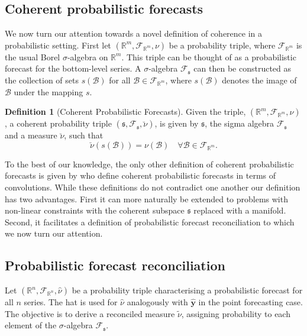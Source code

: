 \documentclass[12pt]{article}
\theoremstyle{definition}
\newtheorem{definition}{Definition}[section]
\begin{document}
\subsection{Coherent probabilistic forecasts}

We now turn our attention towards a novel definition of coherence in a probabilistic setting.  First let $(\mathbb{R}^m, \mathscr{F}_{\mathbb{R}^m}, \nu)$ be a probability triple, where $\mathscr{F}_{\mathbb{R}^m}$ is the usual Borel $\sigma$-algebra on $\mathbb{R}^m$. This triple can be thought of as a probabilistic forecast for the bottom-level series.  A $\sigma$-algebra $\mathscr{F}_{\mathfrak{s}}$ can then be constructed as the collection of sets $s(\mathcal{B})$ for all $\mathcal{B}\in \mathscr{F}_{\mathbb{R}^m}$, where $s(\mathcal{B})$ denotes the image of $\mathcal{B}$ under the mapping $s$.

\begin{definition}[Coherent Probabilistic Forecasts]\label{def:cohprob}
	Given the triple, $(\mathbb{R}^m, \mathscr{F}_{\mathbb{R}^m}, \nu)$, a coherent probability triple $(\mathfrak{s}, \mathscr{F}_{\mathfrak{s}}, \breve{\nu})$, is given by $\mathfrak{s}$, the sigma algebra $\mathscr{F}_{\mathfrak{s}}$ and a measure $\breve{\nu}$, such that
	\[
	\breve{\nu}(s(\mathcal{B})) = \nu(\mathcal{B}) \quad \forall \mathcal{B} \in \mathscr{F}_{\mathbb{R}^m}.
	\]
\end{definition}

To the best of our knowledge, the only other definition of coherent probabilistic forecasts is given by \cite{Taieb2017} who define coherent probabilistic forecasts in terms of convolutions. While these definitions do not contradict one another our definition has two advantages.  First it can more naturally be extended to problems with non-linear constraints with the coherent subspace $\mathfrak{s}$ replaced with a manifold.  Second, it facilitates a definition of probabilistic forecast reconciliation to which we now turn our attention.

\subsection{Probabilistic forecast reconciliation}

Let $(\mathbb{R}^n, \mathscr{F}_{\mathbb{R}^n}, \hat{\nu})$ be a probability triple characterising a probabilistic forecast for all $n$ series. The hat is used for $\hat{\nu}$ analogously with $\hat{\bm y}$ in the point forecasting case.  The objective is to derive a reconciled measure $\tilde{\nu}$, assigning probability to each element of the $\sigma$-algebra $\mathscr{F}_\mathfrak{s}$.
\end{document}
